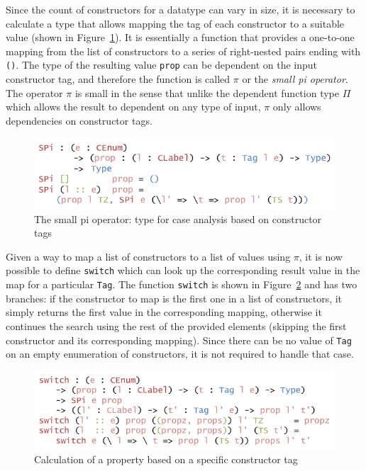 \documentclass{ituthesis}
\newcommand{\tttype}[1]{\textcolor{type-color}{\texttt{#1}}}
\newcommand{\ttdec}[1]{\textcolor{declared-var-color}{\texttt{#1}}}
\newcommand{\ttvar}[1]{\textcolor{local-var-color}{\texttt{#1}}}
\theoremstyle{break}
\begin{document}
Since the count of constructors for a datatype can vary in size, it is necessary to calculate a type that allows mapping the tag of each constructor to a suitable value (shown in Figure~\ref{fig:smallpiop}). 
It is essentially a function that provides a one-to-one mapping from the list of constructors to a series of right-nested pairs ending with \tttype{()}.
The type of the resulting value \ttvar{prop} can be dependent on the input constructor tag, and therefore the function is called $\pi$ or the \textit{small pi operator}.
The operator $\pi$ is small in the sense that unlike the dependent function type $\Pi$ which allows the result to dependent on any type of input, $\pi$ only allows dependencies on constructor tags.

\begin{figure}[ht]
\begin{center}
    \includegraphics[scale=0.5]{Figures/AConstructiveTypeofChoice.png}
\end{center}
\caption{The small pi operator: type for case analysis based on constructor tags}
\label{fig:smallpiop}
\end{figure}

Given a way to map a list of constructors to a list of values using $\pi$, it is now possible to define \ttdec{switch} which can look up the corresponding result value in the map for a particular \tttype{Tag}.
The function \ttdec{switch} is shown in Figure~\ref{fig:switchctor} and has two branches: if the constructor to map is the first one in a list of constructors, it simply returns the first value in the corresponding mapping, otherwise
it continues the search using the rest of the provided elements (skipping the first constructor and its corresponding mapping).
Since there can be no value of \tttype{Tag} on an empty enumeration of constructors, it is not required to handle that case.

\begin{figure}[ht]
\begin{center}
    \includegraphics[scale=0.5]{Figures/AConstructiveChoice.png}
\end{center}
\caption{Calculation of a property based on a specific constructor tag}
\label{fig:switchctor}
\end{figure}
\end{document}
